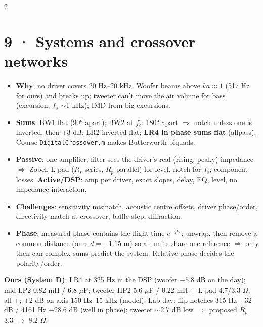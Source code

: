 \documentclass[8pt]{extarticle}
\begin{document}
\begin{multicols}{2}
\section{9 · Systems and crossover networks}
\begin{itemize}
\item \textbf{Why}: no driver covers 20 Hz–20 kHz. Woofer beams above $ka\approx1$ (517 Hz for ours) and breaks up; tweeter can't move the air volume for bass (excursion, $f_s$ $\sim$1 kHz); IMD from big excursions.
\item \textbf{Sums}: BW1 flat (90° apart); BW2 at $f_c$: 180° apart $\Rightarrow$ notch unless one is inverted, then +3 dB; LR2 inverted flat; \textbf{LR4 in phase sums flat} (allpass). Course \texttt{DigitalCrossover.m} makes Butterworth biquads.
\item \textbf{Passive}: one amplifier; filter sees the driver's real (rising, peaky) impedance $\Rightarrow$ Zobel, L-pad ($R_s$ series, $R_p$ parallel) for level, notch for $f_s$; component losses. \textbf{Active/DSP}: amp per driver, exact slopes, delay, EQ, level, no impedance interaction.
\item \textbf{Challenges}: sensitivity mismatch, acoustic centre offsets, driver phase/order, directivity match at crossover, baffle step, diffraction.
\item \textbf{Phase}: measured phase contains the flight time $e^{-jkr}$; unwrap, then remove a common distance (ours $d=-1.15$ m) so all units share one reference $\Rightarrow$ only then can complex sums predict the system. Relative phase decides the polarity/order.
\end{itemize}
\textbf{Ours (System D)}: LR4 at 325 Hz in the DSP (woofer $-5.8$ dB on the day); mid LP2 0.82 mH / 6.8 $\mu$F; tweeter HP2 5.6 $\mu$F / 0.22 mH + L-pad 4.7/3.3 $\Omega$; all +; $\pm$2 dB on axis 150 Hz–15 kHz (model). Lab day: flip notches 315 Hz $-32$ dB / 4161 Hz $-28.6$ dB (well in phase); tweeter $\sim$2.7 dB low $\Rightarrow$ proposed $R_p$ 3.3 $\to$ 8.2 $\Omega$.


\end{multicols}
\end{document}

